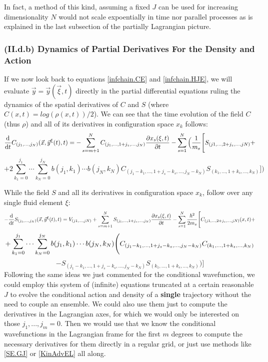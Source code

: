 \documentclass[11pt, a4paper]{article} %
\begin{document}
In fact, a method of this kind, assuming a fixed $J$ can be used for increasing dimensionality $N$ would not scale expoentially in time nor parallel processes as is explained in the last subsection of the partially Lagrangian picture.

\vspace{-0.1cm}

\subsubsection*{(II.d.b) Dynamics of Partial Derivatives For the Density and Action}\vspace{-0.1cm}

If we now look back to equations \eqref{infchain.CE} and \eqref{infchain.HJE}, we will evaluate $\vec{y}=\vec{y}(\vec{\xi},t)$ directly in the partial differential equations ruling the dynamics of the spatial derivatives of $C$ and $S$ (where $C(x,t)=log(\rho(x,t))/2$). We can see that the time evolution of the field $C$ (thus $\rho$) and all of its derivatives in configuration space $x_k$ follows:\vspace{-0.1cm}
\begin{equation}\label{infchain.CE.EL}
\dv{}{t}C_{(j_1,...,j_N)}(\vec{x},\vec{y}^\xi(t),t)=-\sum_{s=m+1}^N C_{(j_1,...,1+j_s,...,j_N)}\pdv{x_s(\xi,t)}{t} - \sum_{s=1}^N\Big(\frac{1}{m_s} \Bigg[S_{(j1,...,2+j_s,...,jN)}+
\end{equation}
$$
+2 \sum_{k_1=0}^{j_1}\cdots\sum_{k_N=0}^{j_N} b(j_1,k_1)\cdots b(j_N,k_N)C_{(j_1-k_1,...,1+j_s-k_s,...,j_N-k_N)}S_{(k_1,...,1+k_s,...,k_N)} \Bigg]\bigg)
$$

While the field $S$ and all its derivatives in configuration space $x_k$, follow over any single fluid element $\xi$:\vspace{-0.1cm}
\begin{equation}\label{infchain.HJE.EL}
-\dv{}{t}S_{(j_1,...,j_N)}(\vec{x},\vec{y}^\xi(t),t)=V_{(j1,...,jN)}+\sum_{s=m+1}^N S_{(j_1,...,1+j_s,...,j_N)}\pdv{x_s(\xi,t)}{t}-\sum_{s=1}^N\frac{\hbar^2}{2m_s} \Bigg[ C_{(j1,...,2+j_s,...,jN)}(x,t)+\vspace{-0.1cm}
\end{equation}
$$
+\sum_{k_1=0}^{j_1}\cdots\sum_{k_N=0}^{j_N} b(j_1,k_1)\cdots b(j_N,k_N) \Bigg( C_{(j_1-k_1,...,1+j_s-k_s,...,j_N-k_N)}C_{(k_1,...,1+k_s,...,k_N)} \vspace{-0.1cm}
$$
$$
-S_{(j_1-k_1,...,1+j_s-k_s,...,j_N-k_N)}S_{(k_1,...,1+k_s,...,k_N)}  \Bigg)\Bigg]
$$
Following the same ideas we just commented for the conditional wavefunction, we could employ this system of (infinite) equations truncated at a certain reasonable $J$ to evolve the conditional action and density of a {\bf single} trajectory without the need to couple an ensemble. We could also use them just to compute the derivatives in the Lagrangian axes, for which we would only be interested on those $j_1,...,j_m=0$. Then we would use that we know the conditional wavefunctions in the Lagrangian frame for the first $m$ degrees to compute the necessary derivatives for them directly in a regular grid, or just use methods like \eqref{SE.GJ} or \eqref{KinAdvEL} all along.
\end{document}

